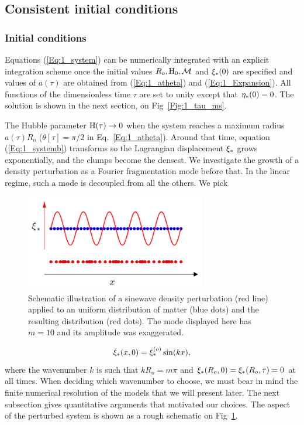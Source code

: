 \subsection{Consistent initial conditions} 
\subsubsection{Initial conditions} 
Equations (\ref{Eq:1_system}) can be numerically integrated with an explicit integration scheme once the initial values $R_o, {\textrm{H}}_0, {\cal M}$ and $\xi_\ast(0)$ are specified and values of $a(\tau)$ are obtained from (\ref{Eq:1_atheta}) and (\ref{Eq:1_Expansion}). All functions of the dimensionless time $\tau$ are set to unity except that $\eta_\ast(0) = 0$. The solution is shown in the next section,  on Fig~\ref{Fig:1_tau_ms}.


The Hubble parameter ${\textrm{H}}(\tau) \rightarrow 0$ when the system reaches a maximum radius $a(\tau)R_o$ ($\theta[\tau]=\pi/2$ in Eq.~\ref{Eq:1_atheta}). Around that time, equation (\ref{Eq:1_systemb}) transforms so the Lagrangian displacement $\xi_\ast$ grows exponentially, and the clumps become the densest. We investigate the growth of a density perturbation as a Fourier fragmentation mode before that. In the linear regime, such a mode is decoupled from all the others. We pick 

 \begin{figure}
	\center
 	\includegraphics[width=0.7\textwidth]{Figures/1_perturbation.png}
	\caption{Schematic illustration of a sinewave density perturbation (red line) applied to an uniform distribution of matter (blue dots) and the resulting distribution (red dots). The mode displayed here has $m=10$ and its amplitude was exaggerated.} 
	\label{Fig:1_perturbation}
\end{figure}

\begin{equation} 
\label{Eq:1_FourierMode} 
   \xi_\ast(x,0) = \xi_\ast^{(o)} \sin( kx ) ,
\end{equation}  
where the wavenumber $k$ is such that $k R_o = m \pi$ and $\xi_\ast(R_o,0) = \xi_\ast(R_o,\tau) = 0$ at all times. When deciding which wavenumber to choose, we must bear in mind the finite numerical resolution of the models that we will present later. The next subsection gives quantitative arguments that motivated our choices.  
The aspect of the perturbed system is shown as a rough schematic on Fig~\ref{Fig:1_perturbation}.

